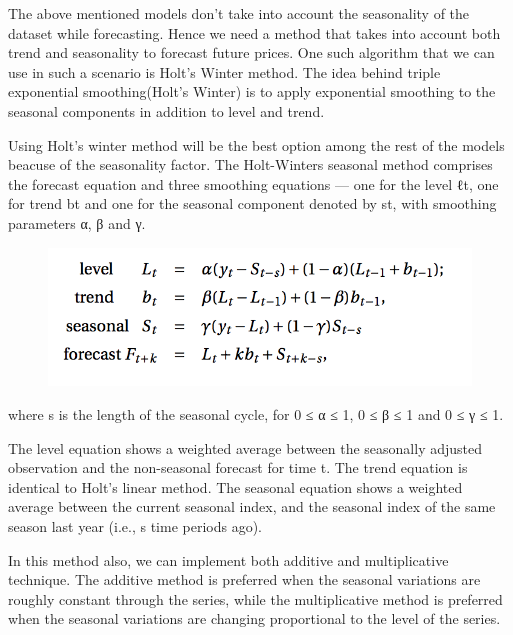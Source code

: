 \documentclass[11pt]{article}
\makeatletter
\def\maxwidth{\ifdim\Gin@nat@width>\linewidth\linewidth
    \else\Gin@nat@width\fi}
\let\Oldincludegraphics\includegraphics
\renewcommand{\includegraphics}[1]{\Oldincludegraphics[width=.8\maxwidth]{#1}}
\makeatother
\begin{document}
The above mentioned models don't take into account the seasonality of
the dataset while forecasting. Hence we need a method that takes into
account both trend and seasonality to forecast future prices. One such
algorithm that we can use in such a scenario is Holt's Winter method.
The idea behind triple exponential smoothing(Holt's Winter) is to apply
exponential smoothing to the seasonal components in addition to level
and trend.

Using Holt's winter method will be the best option among the rest of the
models beacuse of the seasonality factor. The Holt-Winters seasonal
method comprises the forecast equation and three smoothing equations ---
one for the level ℓt, one for trend bt and one for the seasonal
component denoted by st, with smoothing parameters α, β and γ.

\begin{figure}
\centering
\includegraphics{image14.png}
\caption{}
\end{figure}

where s is the length of the seasonal cycle, for 0 ≤ α ≤ 1, 0 ≤ β ≤ 1
and 0 ≤ γ ≤ 1.

The level equation shows a weighted average between the seasonally
adjusted observation and the non-seasonal forecast for time t. The trend
equation is identical to Holt's linear method. The seasonal equation
shows a weighted average between the current seasonal index, and the
seasonal index of the same season last year (i.e., s time periods ago).

In this method also, we can implement both additive and multiplicative
technique. The additive method is preferred when the seasonal variations
are roughly constant through the series, while the multiplicative method
is preferred when the seasonal variations are changing proportional to
the level of the series.
\end{document}

